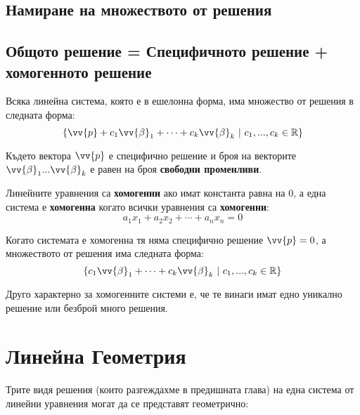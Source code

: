 \documentclass[12pt]{article}
\begin{document}
\subsection{Намиране на множеството от решения}






\subsection{Общото решение = Специфичното решение + хомогенното решение}

\noindent Всяка линейна система, която е в ешелонна форма, има множество от решения в следната форма:
\begin{equation*}
    \{ \vv{p} + c_{1}\vv{\beta}_{1} + \cdots + c_{k}\vv{\beta}_{k}\ |\ c_{1},...,c_{k} \in \mathbb{R}\}
\end{equation*}

\noindent Където вектора $\vv{p}$ е специфично решение и броя на векторите $\vv{\beta}_{1} ... \vv{\beta}_{k}$ е равен на броя \textbf{свободни променливи}.

\noindent Линейните уравнения са \textbf{хомогенни} ако имат константа равна на 0, а една система е \textbf{хомогенна} когато всички уравнения са \textbf{хомогенни}:
\begin{equation*}
    a_{1}x_{1} + a_{2}x_{2} + \cdots + a_{n}x_{n} = 0
\end{equation*}

\noindent Когато системата е хомогенна тя няма специфично решение $\vv{p} = 0$, а множеството от решения има следната форма:
\begin{equation*}
    \{ c_{1}\vv{\beta}_{1} + \cdots + c_{k}\vv{\beta}_{k}\ |\ c_{1},...,c_{k} \in \mathbb{R}\}
\end{equation*}

\noindent Друго характерно за хомогенните системи е, че те винаги имат едно уникално решение или безброй много решения.




\section{Линейна Геометрия}

Трите видя решения (които разгеждахме в предишната глава) на една система от линейни уравнения могат да се представят геометрично:
\end{document}
